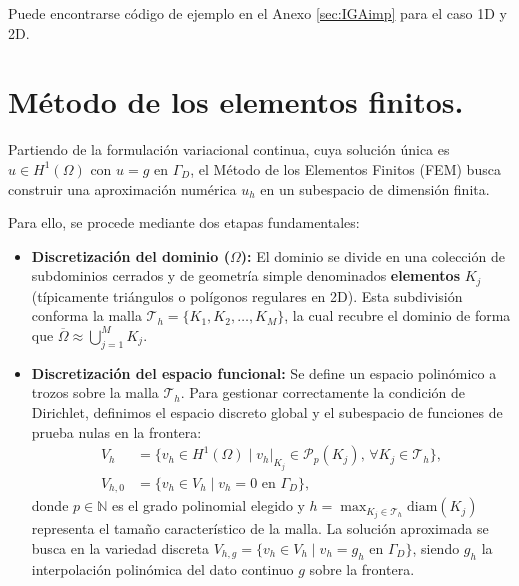 \documentclass[11pt]{book}
\theoremstyle{plain} %
\theoremstyle{definition} %
\theoremstyle{definition} %
\begin{document}
Puede encontrarse código de ejemplo en el Anexo \ref{sec:IGAimp} para el caso 1D y 2D.



\section{Método de los elementos finitos.}
\label{FEM}
Partiendo de la formulación variacional continua, cuya solución única es $u \in H^1(\Omega)$ con $u=g$ en $\Gamma_D$, el Método de los Elementos Finitos (FEM) busca construir una aproximación numérica $u_h$ en un subespacio de dimensión finita.

Para ello, se procede mediante dos etapas fundamentales:

\begin{itemize}
    \item \textbf{Discretización del dominio ($\Omega$):} El dominio se divide en una colección de subdominios cerrados y de geometría simple denominados \textbf{elementos} $K_j$ (típicamente triángulos o polígonos regulares en 2D). Esta subdivisión conforma la malla $\mathcal{T}_h=\{K_1, K_2,\dots,K_M\}$, la cual recubre el dominio de forma que $\overline{\Omega} \approx \bigcup_{j=1}^{M} K_j$.
    
    \item \textbf{Discretización del espacio funcional:} Se define un espacio polinómico a trozos sobre la malla $\mathcal{T}_h$. Para gestionar correctamente la condición de Dirichlet, definimos el espacio discreto global y el subespacio de funciones de prueba nulas en la frontera:
    \begin{align*}
        V_h &= \{ v_h \in H^1(\Omega) \mid v_h|_{K_j} \in \mathcal{P}_p(K_j), \, \forall K_j \in \mathcal{T}_h \}, \\
        V_{h,0} &= \{ v_h \in V_h \mid v_h = 0 \text{ en } \Gamma_D \},
    \end{align*}
    donde $p \in \mathbb{N}$ es el grado polinomial elegido y $h = \max_{K_j \in \mathcal{T}_h} \text{diam}(K_j)$ representa el tamaño característico de la malla. La solución aproximada se busca en la variedad discreta $V_{h,g} = \{ v_h \in V_h \mid v_h = g_h \text{ en } \Gamma_D \}$, siendo $g_h$ la interpolación polinómica del dato continuo $g$ sobre la frontera.
    

\end{itemize}
\end{document}
